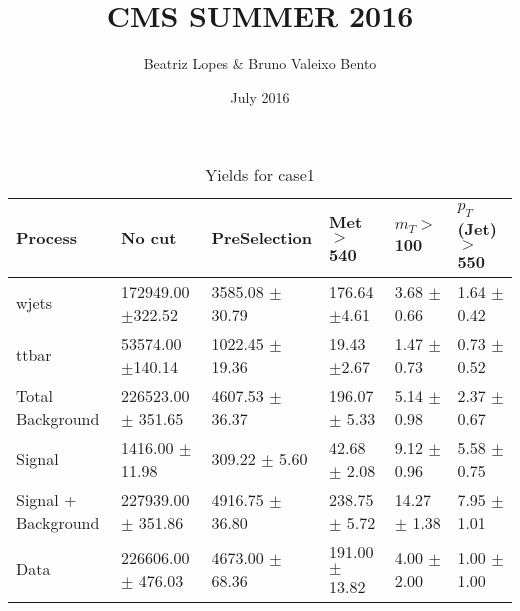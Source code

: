\documentclass{article}
\title{CMS SUMMER 2016}
\author{Beatriz Lopes &  Bruno Valeixo Bento}
\date{July 2016}
\begin{document}
\maketitle
\begin{table}[!h]
\begin{tabular}{llllll}
\hline
Process & No cut& PreSelection& Met $>$ 540& $m_T >$ 100& $p_T$ (Jet) $>$ 550\\
\hline
wjets & 172949.00 $\pm$322.52 & 3585.08 $\pm$30.79 & 176.64 $\pm$4.61 & 3.68 $\pm$0.66 & 1.64 $\pm$0.42 \\
ttbar & 53574.00 $\pm$140.14 & 1022.45 $\pm$19.36 & 19.43 $\pm$2.67 & 1.47 $\pm$0.73 & 0.73 $\pm$0.52 \\
Total Background & 226523.00 $\pm$ 351.65 & 4607.53 $\pm$ 36.37 & 196.07 $\pm$ 5.33 & 5.14 $\pm$ 0.98 & 2.37 $\pm$ 0.67 \\
\hline
Signal & 1416.00 $\pm$ 11.98 & 309.22 $\pm$ 5.60 & 42.68 $\pm$ 2.08 & 9.12 $\pm$ 0.96 & 5.58 $\pm$ 0.75 \\
\hline
Signal + Background & 227939.00 $\pm$ 351.86 & 4916.75 $\pm$ 36.80 & 238.75 $\pm$ 5.72 & 14.27 $\pm$ 1.38 & 7.95 $\pm$ 1.01 \\
\hline
\hline
Data & 226606.00 $\pm$ 476.03 & 4673.00 $\pm$ 68.36 & 191.00 $\pm$ 13.82 & 4.00 $\pm$ 2.00 & 1.00 $\pm$ 1.00 \\
\hline
\end{tabular}
\caption{Yields for case1}
\end{table}
\end{document}
